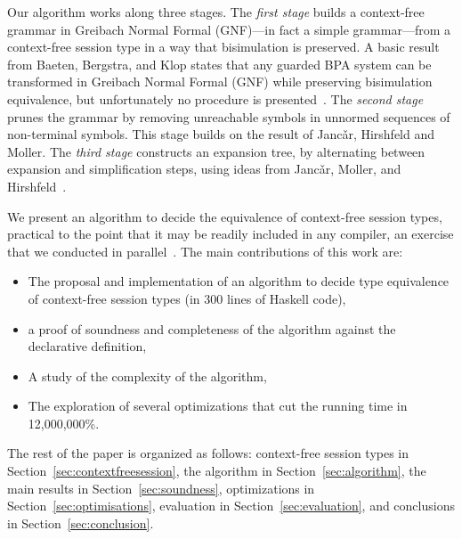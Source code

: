Our algorithm works along three stages.
%
The \emph{first stage} builds a context-free grammar in Greibach
Normal Formal (GNF)---in fact a simple grammar---from a context-free
session type in a way that bisimulation is preserved.  A basic result
from Baeten, Bergstra, and Klop states that any guarded BPA system can
be transformed in Greibach Normal Formal (GNF) while preserving
bisimulation equivalence, but unfortunately no procedure is
presented~\cite{baeten1993decidability}.
%
The \emph{second stage} prunes the grammar by removing unreachable
symbols in unnormed sequences of non-terminal symbols. This stage
builds on the result of Janc\v ar, Hirshfeld and Moller.
%
The \emph{third stage} constructs an expansion tree, by alternating
between expansion and simplification steps, using ideas from Janc\v
ar, Moller, and
Hirshfeld~\cite{hirshfeld1996bisimulation,janvcar1999techniques}.
%

We present an algorithm to decide the equivalence of context-free
session types, practical to the point that it may be readily included
in any compiler, an exercise that we conducted in
parallel~\cite{freeST}.
%
The main contributions of this work are:
%
\begin{itemize}
\item The proposal and implementation of an algorithm to decide type
  equivalence of context-free session types (in 300 lines of Haskell
  code),
\item a proof of soundness and completeness of the algorithm against
  the declarative definition,
\item A study of the complexity of the algorithm,
\item The exploration of several optimizations that cut the running
  time in 12,000,000\%.
\end{itemize}


The rest of the paper is organized as follows: context-free session
types in Section~\ref{sec:contextfreesession}, the algorithm in
Section~\ref{sec:algorithm}, the main results in
Section~\ref{sec:soundness}, optimizations in
Section~\ref{sec:optimisations}, evaluation in
Section~\ref{sec:evaluation}, and conclusions in
Section~\ref{sec:conclusion}.


